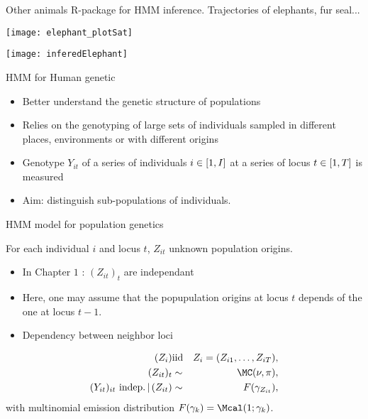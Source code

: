 \documentclass[compress,10pt]{beamer}
\begin{document}
\begin{frame}{Other animals  \cite{McClintock2018}}
\textsf{R}-package for HMM inference. Trajectories of elephants, fur seal... 

\begin{center} 
\begin{minipage}[c]{.46\linewidth}
\texttt{[image: elephant\_plotSat]}
\end{minipage} \hfill
\begin{minipage}[c]{.46\linewidth}
\texttt{[image: inferedElephant]}
\end{minipage}
\end{center}
 
 

\end{frame}
\begin{frame}{HMM for Human genetic}

\begin{itemize}
 \item Better understand the genetic structure of populations
 \item Relies on the genotyping of large sets of individuals sampled in different places, environments or with different origins
 \item Genotype $Y_{it}$ of a series of individuals $i \in \interval{1}{I}$ at a series of locus $t \in \interval{1}{T}$ is measured
 \item \textcolor{dgreen}{Aim}: distinguish sub-populations of individuals.
\end{itemize}

\end{frame}


\begin{frame}{HMM model for population genetics}

For each individual $i$ and locus $t$, $Z_{it}$ unknown population origins. 

\begin{itemize}
 \item In Chapter $1$  : $(Z_{it})_t$ are independant
 \item Here, one may assume that the popupulation origins at locus $t$ depends  of the one at locus $t-1$. 
 \item Dependency between neighbor loci
 \end{itemize}

\begin{eqnarray*} 
  (Z_i) & \text{iid} & Z_i = (Z_{i1}, \dots, Z_{iT}), \\
 (Z_{it})_t & \sim & \MC(\nu, \pi), \\
 (Y_{it})_{it} \text{ indep.} \,|\, (Z_{it}) & \sim & F(\gamma_{Z_{it}}),
\end{eqnarray*}
with multinomial emission distribution $F(\gamma_k) = \Mcal(1; \gamma_k)$.
\end{frame}
\end{document}
